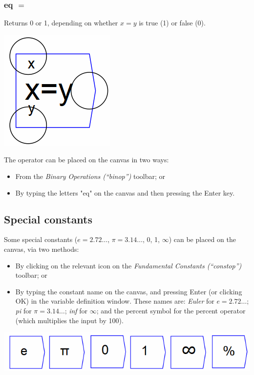 \subsubsection{eq $=$}

\label{Operation:eq} Returns 0 or 1, depending on whether $x=y$
is true (1) or false (0).

\includegraphics{images/EqualKey}

The operator can be placed on the canvas in two ways:
\begin{itemize}
\item From the \emph{Binary Operations (``binop'')} toolbar; or 
\item By typing the letters "eq" on the canvas and then pressing the Enter
key. 
\end{itemize}

\subsection{Special constants}

\label{Special-constants}

\label{Operation:euler}\label{Operation:pi}\label{Operation:zero}\label{Operation:one}
\label{Operation:inf}

Some special constants ($e=2.72\ldots$, $\pi=3.14\ldots$, 0, 1,
$\infty$) can be placed on the canvas, via two methods:
\begin{itemize}
\item By clicking on the relevant icon on the \emph{Fundamental Constants
(``constop'')} toolbar; or 
\item By typing the constant name on the canvas, and pressing Enter (or
clicking OK) in the variable definition window. These names are: \textit{Euler}
for $e=2.72\ldots$; \textit{pi} for $\pi=3.14\ldots$; \textit{inf}
for $\infty$; and the percent symbol for the percent operator (which
multiplies the input by 100).
\end{itemize}
\includegraphics{images/FundamentalConstants}

